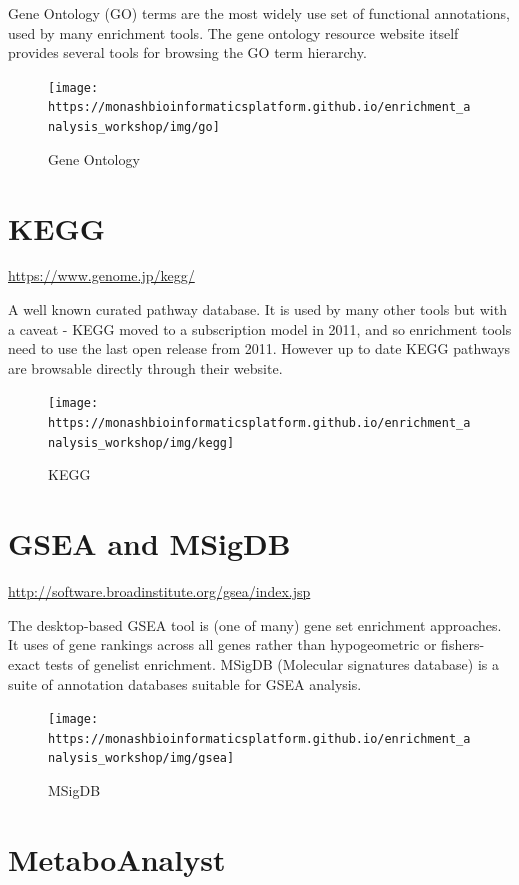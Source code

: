 \documentclass[
]{book}
\begin{document}
Gene Ontology (GO) terms are the most widely use set of functional annotations, used by many enrichment tools. The gene ontology resource website itself provides several tools for browsing the GO term hierarchy.

\begin{figure}
\texttt{[image: https://monashbioinformaticsplatform.github.io/enrichment\_analysis\_workshop/img/go]} \caption{Gene Ontology}\label{fig:unnamed-chunk-44}
\end{figure}

\hypertarget{kegg}{%
\section{KEGG}\label{kegg}}

\url{https://www.genome.jp/kegg/}

A well known curated pathway database. It is used by many other tools but with a caveat - KEGG moved to a subscription model in 2011, and so enrichment tools need to use the last open release from 2011. However up to date KEGG pathways are browsable directly through their website.

\begin{figure}
\texttt{[image: https://monashbioinformaticsplatform.github.io/enrichment\_analysis\_workshop/img/kegg]} \caption{KEGG}\label{fig:unnamed-chunk-45}
\end{figure}

\hypertarget{gsea-and-msigdb}{%
\section{GSEA and MSigDB}\label{gsea-and-msigdb}}

\url{http://software.broadinstitute.org/gsea/index.jsp}

The desktop-based GSEA tool is (one of many) gene set enrichment approaches. It uses of gene rankings across all genes rather than hypogeometric or fishers-exact tests of genelist enrichment. MSigDB (Molecular signatures database) is a suite of annotation databases suitable for GSEA analysis.

\begin{figure}
\texttt{[image: https://monashbioinformaticsplatform.github.io/enrichment\_analysis\_workshop/img/gsea]} \caption{MSigDB}\label{fig:unnamed-chunk-46}
\end{figure}

\hypertarget{metaboanalyst}{%
\section{MetaboAnalyst}\label{metaboanalyst}}
\end{document}
